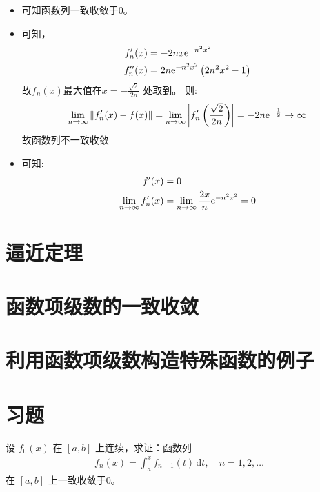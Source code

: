 \begin{solution}
    \begin{itemize}
        \item 可知函数列一致收敛于\(0\)。
        \item 可知，
            \begin{align*}
                f_{n}'(x)  & = -2nx\mathrm{e}^{-n^{2}x^{2}}     \\
                f_{n}''(x) & = 2n\mathrm{e}^{-n^{2}x^{2}}\left(
                2n^{2}x^{2} - 1\right)
            \end{align*}
            故\(f_{n}(x)\)最大值在\(x = -\frac{\sqrt{2}}{2n}\) 处取到。
            则: \[
                \lim_{n \to \infty} \left\lVert f_{n}'(x) - f(x)
                \right\rVert = \lim_{n \to \infty} \left|
                f'_{n}\left(\frac{\sqrt{2}}{2n}\right) \right| =
                -2n\mathrm{e}^{-\frac{1}{2}} \to \infty
            \]
            故函数列不一致收敛
        \item 可知:
            \begin{align*}
                f'(x)                         & = 0
                \\
                \lim_{n \to \infty} f'_{n}(x) & = \lim_{n \to \infty}
                \frac{2x}{n}\mathrm{e}^{-n^{2}x^{2}} = 0
            \end{align*}
    \end{itemize}
\end{solution}
\section{逼近定理}
\section{函数项级数的一致收敛}
\section{利用函数项级数构造特殊函数的例子}
\section{习题}

\begin{problem}
    设 \(f_0(x)\) 在 \([a, b]\) 上连续，求证：函数列
    \begin{align*}
        f_n(x) = \int_a^x f_{n-1}(t) \, \mathrm{d}t, \quad
        n = 1, 2, \dots
    \end{align*}
    在 \([a, b]\) 上一致收敛于0。
\end{problem}

